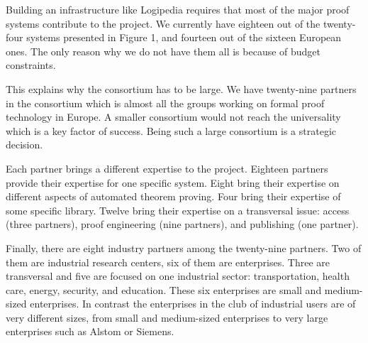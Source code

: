 Building an infrastructure like Logipedia requires that most of the
major proof systems contribute to the project. We currently have eighteen out of
the twenty-four systems presented in Figure 1, and fourteen out of the
sixteen European ones.  The only reason why we do not have them all is
because of budget constraints.

This explains why the consortium has to be large.  We have twenty-nine
partners in the consortium which is almost all the groups working on
formal proof technology in Europe.  A smaller consortium would not
reach the universality which is a key factor of success.  Being such a
large consortium is a strategic decision.

Each partner brings a different expertise to the project.  Eighteen
partners provide their expertise for one specific system.  Eight bring
their expertise on different aspects of automated theorem
proving. Four bring their expertise of some specific library. Twelve
bring their expertise on a transversal issue: access (three partners),
proof engineering (nine partners), and publishing (one partner).


Finally, there are eight industry partners among the twenty-nine partners.
Two of them are industrial research centers, six of them are enterprises.
Three are transversal and five are
focused on one industrial sector: transportation, health care, energy,
security, and education. These six enterprises are small and
medium-sized enterprises. In contrast the enterprises in the club of
industrial users are of very different sizes, from small and medium-sized
enterprises to very large enterprises such as Alstom or Siemens.

